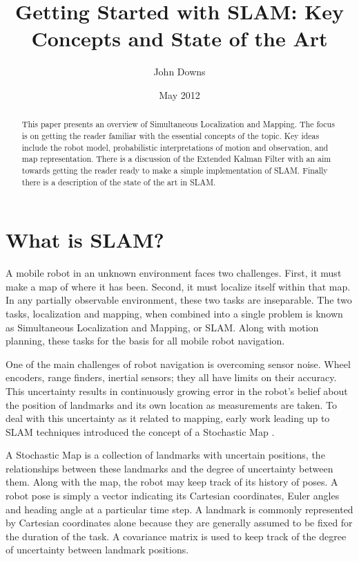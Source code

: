 \documentclass[12pt]{article}
\title{Getting Started with SLAM: Key Concepts and State of the Art}
\author{John Downs}
\date{May 2012}
\begin{document}
\maketitle

\begin{abstract}
This paper presents an overview of Simultaneous Localization and Mapping.  The focus is on getting the reader familiar with the essential concepts of the topic.  Key ideas include the robot model, probabilistic interpretations of motion and observation, and map representation.  There is a discussion of the Extended Kalman Filter with an aim towards getting the reader ready to make a simple implementation of SLAM.  Finally there is a description of the state of the art in SLAM.
\end{abstract}

\section{What is SLAM?}

A mobile robot in an unknown environment faces two challenges.  First, it must make a map of where it has been.  Second, it must localize itself within that map.  In any partially observable environment, these two tasks are inseparable.  The two tasks, localization and mapping, when combined into a single problem is known as Simultaneous Localization and Mapping, or SLAM.  Along with motion planning, these tasks for the basis for all mobile robot navigation.

One of the main challenges of robot navigation is overcoming sensor noise.  Wheel encoders, range finders, inertial sensors; they all have limits on their accuracy.  This uncertainty results in continuously growing error in the robot's belief about the position of landmarks and its own location as measurements are taken.  To deal with this uncertainty as it related to mapping, early work leading up to SLAM techniques introduced the concept of a Stochastic Map \cite{cheeseman1987stochastic}.  

A Stochastic Map is a collection of landmarks with uncertain positions, the relationships between these landmarks and the degree of uncertainty between them.  Along with the map, the robot may keep track of its history of poses.  A robot pose is simply a vector indicating its Cartesian coordinates, Euler angles and heading angle at a particular time step.  A landmark is commonly represented by Cartesian coordinates alone because they are generally assumed to be fixed for the duration of the task.  A covariance matrix is used to keep track of the degree of uncertainty between landmark positions.
\end{document}
